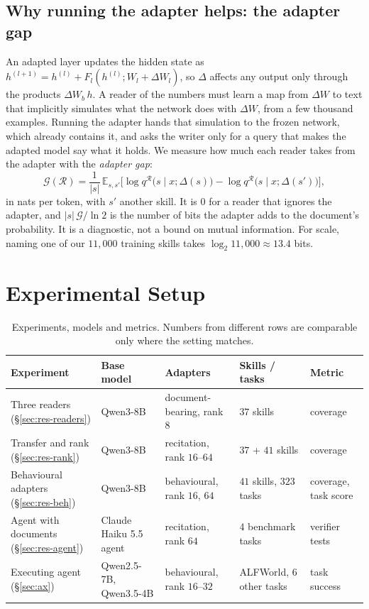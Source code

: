 \documentclass[11pt]{article}
\begin{document}
\subsection{Why running the adapter helps: the adapter gap}
\label{sec:info}

An adapted layer updates the hidden state as $h^{(l+1)}=h^{(l)}+F_l(h^{(l)};W_l+\Delta W_l)$, so $\Delta$ affects any output only through the
products $\Delta W_b\,h$. A reader of the numbers must learn a map from $\Delta W$ to text that implicitly simulates what the network does with
$\Delta W$, from a few thousand examples. Running the adapter hands that simulation to the frozen network, which already contains it, and asks
the writer only for a query that makes the adapted model say what it holds. We measure how much each reader takes from the adapter with the
\emph{adapter gap}:
\[
\mathcal G(\mathcal R)=\frac1{|s|}\,\mathbb E_{s,s'}\Big[\log q^{\mathcal R}\big(s\mid x;\Delta(s)\big)-\log q^{\mathcal R}\big(s\mid x;\Delta(s')\big)\Big],
\]
in nats per token, with $s'$ another skill. It is $0$ for a reader that ignores the adapter, and $|s|\,\mathcal G/\ln 2$ is the number of bits the
adapter adds to the document's probability. It is a diagnostic, not a bound on mutual information. For scale, naming one of our $11{,}000$ training
skills takes $\log_2 11{,}000\approx13.4$ bits.

\section{Experimental Setup}
\label{sec:setup}

\begin{table}[!htb]
\centering
\caption{Experiments, models and metrics. Numbers from different rows are comparable only where the setting matches.}
\label{tab:exps}
\footnotesize
\setlength{\tabcolsep}{4pt}
\begin{tabular}{>{\raggedright\arraybackslash}p{3.2cm}>{\raggedright\arraybackslash}p{2.8cm}>{\raggedright\arraybackslash}p{2.7cm}>{\raggedright\arraybackslash}p{2.3cm}>{\raggedright\arraybackslash}p{2.0cm}}
\toprule
Experiment & Base model & Adapters & Skills / tasks & Metric\\
\midrule
Three readers (\S\ref{sec:res-readers}) & Qwen3-8B & document-bearing, rank $8$ & $37$ skills & coverage\\
Transfer and rank (\S\ref{sec:res-rank}) & Qwen3-8B & recitation, rank $16$--$64$ & $37$ + $41$ skills & coverage\\
Behavioural adapters (\S\ref{sec:res-beh}) & Qwen3-8B & behavioural, rank $16$, $64$ & $41$ skills, $323$ tasks & coverage, task score\\
Agent with documents (\S\ref{sec:res-agent}) & Claude Haiku 5.5 agent & recitation, rank $64$ & $4$ benchmark tasks & verifier tests\\
Executing agent (\S\ref{sec:ax}) & Qwen2.5-7B, Qwen3.5-4B & behavioural, rank $16$--$32$ & ALFWorld, $6$ other tasks & task success\\
\bottomrule
\end{tabular}
\end{table}
\end{document}
